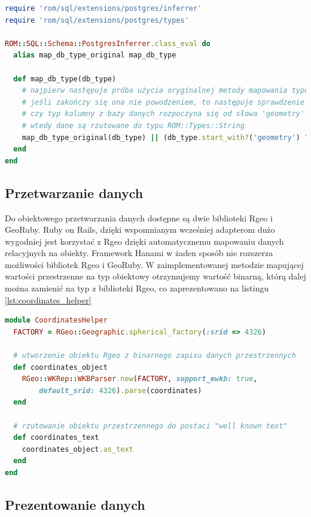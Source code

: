 \documentclass[printmode]{mgr}
\begin{document}
\begin{lstlisting}[language=Ruby, caption={Obsługa typów geometrycznych z biblioteki Postgis przez Hanami}, label=lst:postgis_patching]
require 'rom/sql/extensions/postgres/inferrer'
require 'rom/sql/extensions/postgres/types'

ROM::SQL::Schema::PostgresInferrer.class_eval do
  alias map_db_type_original map_db_type

  def map_db_type(db_type)
    # najpierw następuje próba użycia oryginalnej metody mapowania typów
    # jeśli zakończy się ona nie powodzeniem, to następuje sprawdzenie 
    # czy typ kolumny z bazy danych rozpoczyna się od słowa 'geometry'
    # wtedy dane są rzutowane do typu ROM::Types::String
    map_db_type_original(db_type) || (db_type.start_with?('geometry') ? ROM::Types::String : nil)
  end
end
\end{lstlisting}

\subsection{Przetwarzanie danych}

 Do obiektowego przetwarzania danych dostępne są dwie biblioteki Rgeo i GeoRuby. Ruby on Rails, dzięki wspomnianym wcześniej adapterom dużo wygodniej jest korzystać z Rgeo dzięki automatycznemu mapowaniu danych relacyjnych na obiekty.
 Framework Hanami w żaden sposób nie rozszerza możliwości bibliotek Rgeo i GeoRuby. W zaimplementowanej metodzie mapującej wartości przestrzenne na typ obiektowy otrzymujemy wartość binarną, którą dalej można zamienić na typ z biblioteki Rgeo, co zaprezentowano na listingu \ref{lst:coordinates_helper}

 \begin{lstlisting}[language=Ruby, caption={Tworzenie obiektu Rgeo z zapisu binarnego danych przestrzennych}, label=lst:coordinates_helper]
module CoordinatesHelper
  FACTORY = RGeo::Geographic.spherical_factory(:srid => 4326)

  # utworzenie obiektu Rgeo z binarnego zapisu danych przestrzennych
  def coordinates_object
    RGeo::WKRep::WKBParser.new(FACTORY, support_ewkb: true,
        default_srid: 4326).parse(coordinates)
  end

  # rzutowanie obiektu przestrzennego do postaci "well known text"
  def coordinates_text
    coordinates_object.as_text
  end
end
\end{lstlisting}

\subsection{Prezentowanie danych}
\end{document}
